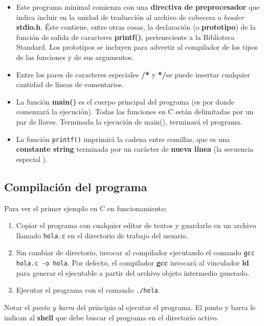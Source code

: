 \begin{itemize}
\item Este programa minimal comienza con una \textbf{directiva de preprocesador} que indica incluir en la unidad de traducción al
archivo de cabecera o \textit{header} \textbf{stdio.h}. Éste contiene, entre otras
cosas, la declaración (o \textbf{prototipo}) de la función de
salida de caracteres \textbf{printf()}, perteneciente a la Biblioteca Standard. Los prototipos se incluyen para
advertir al compilador de los tipos de las funciones y de sus
argumentos. 
\item Entre los pares de caracteres especiales \textbf{/*} y \textbf{*/}se puede insertar cualquier cantidad de líneas de comentarios. 
\item La función \textbf{main()} es el cuerpo principal del programa
(es por donde comenzará la ejecución). Todas las funciones en C están delimitadas por un par de llaves. Terminada la ejecución de
main(), terminará el programa. 
\item La función \lstinline{printf()} imprimirá la cadena entre comillas, que es
una \textbf{constante string} terminada por un carácter de
\textbf{nueva línea} (la secuencia especial \quotes{\lstinline{\n}}). 
\end{itemize}

\subsection{Compilación del programa}
Para ver el primer ejemplo en C en funcionamiento:

\begin{enumerate}
	\item Copiar el programa con cualquier editor de textos y guardarlo en un archivo llamado \lstinline{hola.c} en el directorio de trabajo del usuario.
	\item Sin cambiar de directorio, invocar al compilador ejecutando el comando \lstinline{gcc hola.c -o hola}. Por defecto, el compilador \textbf{gcc} invocará al vinculador \textbf{ld} para generar el ejecutable a partir del archivo objeto intermedio generado. 
	\item Ejecutar el programa con el comando \lstinline{./hola}. 
\end{enumerate}

Notar el \textit{punto y barra} del principio al ejecutar el programa. El punto y barra le indican al \textbf{shell} que debe buscar el programa en el directorio activo.

